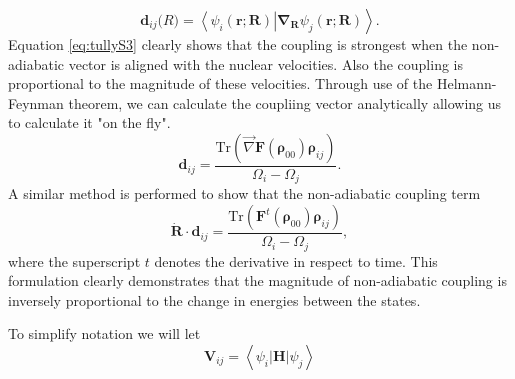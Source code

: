           \begin{equation} \label{eq:tullynacoupling} 
            \mathbf{d}_{ij}\mathbf(R) =
            \left<\psi_{i}(\mathbf{r};\mathbf{R})\right|\mathbf{\nabla}_{\mathbf{R}}\left.\psi_j(\mathbf{r};\mathbf{R})\right>.
          \end{equation}
          Equation \ref{eq:tullyS3} clearly shows that the coupling is strongest when the non-adiabatic vector is aligned with the nuclear velocities.
          Also the coupling is proportional to the magnitude of these velocities.
          Through use of the Helmann-Feynman theorem, we can calculate the coupliing vector analytically allowing us to calculate it "on the fly". \cite{chernyak2000density,tommasini2001electronic,tretiak1996collective,tretiak2009representation,Tretiak1996,Tretiak1999}
          \begin{equation}\label{NACouplingAnalytic}
            \mathbf{d}_{ij} = \frac{\text{Tr}(\vec{\nabla}\mathbf{F}(\bm{\rho}_{00})\bm{\rho}_{ij})}
                   {\Omega_i - \Omega_j}.
          \end{equation}
     A similar method is performed to show that the non-adiabatic coupling term
\begin{equation}\label{eq:NACouplingTerm}
\dot{\mathbf{R}} \cdot \mathbf{d}_{ij} = \frac{\text{Tr}(\mathbf{F}^t(\bm{\rho}_{00}) \bm{\rho}_{ij})}{\Omega_i - \Omega_j},
\end{equation}
where the superscript \(t\) denotes the derivative in respect to time.
          This formulation clearly demonstrates that the magnitude of non-adiabatic coupling is inversely proportional to the change in energies between the states.

          To simplify notation we will let
          \begin{equation}
            \mathbf{V}_{ij} = \left< \psi_i | \mathbf{H} | \psi_j \right>
          \end{equation}

